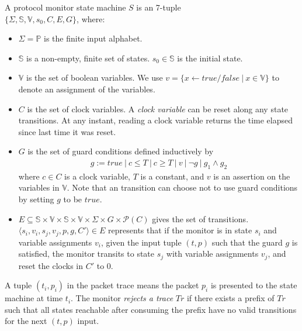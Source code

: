 \begin{definition}
  A protocol monitor state machine $S$ is an 7-tuple\\
  $\{\Sigma, \mathbb{S}, \mathbb{V}, s_0, C, E, G\}$, where:
  \begin{itemize}
    \item $\Sigma = \mathbb{P}$ is the finite input alphabet.

    \item $\mathbb{S}$ is a non-empty, finite set of states. $s_0 \in
      \mathbb{S}$ is the initial state.

    \item $\mathbb{V}$ is the set of boolean variables. We use $v = \{x
      \leftarrow true/false\ |\ x \in \mathbb{V}\}$ to denote an assignment of
      the variables.

    \item $C$ is the set of clock variables. A \textit{clock variable} can be
      reset along any state transitions. At any instant, reading a clock
      variable returns the time elapsed since last time it was reset.

    \item $G$ is the set of guard conditions defined inductively by
      \begin{align*}
        g := true\ |\ c \le T\ |\ c \ge T\ |\ v\ |\ \neg g\ |\ g_1 \land g_2
      \end{align*}%
      where $c \in C$ is a clock variable, $T$ is a constant, and $v$ is an
      assertion on the variables in $\mathbb{V}$. Note that an
      transition can choose not to use guard conditions by setting $g$ to be $true$.

    \item $E \subseteq \mathbb{S} \times \mathbb{V} \times \mathbb{S} \times
      \mathbb{V} \times \Sigma \times  G \times \mathscr{P}(C)$ gives the set of
      transitions.\\ $\langle s_i, v_i, s_j, v_j, p, g, C'\rangle \in E$
      represents that if the monitor is in state $s_i$ and variable assignments
      $v_i$, given the input tuple $(t, p)$ such that the guard $g$ is
      satisfied, the monitor transits to state $s_j$ with variable assignments
      $v_j$, and reset the clocks in $C'$ to 0.
  \end{itemize}
  \label{def:sm}
\end{definition}

A tuple $(t_i, p_i)$ in the packet trace means the packet $p_i$ is presented to
the state machine at time $t_i$. The monitor {\it rejects a trace} $Tr$ if there
exists a prefix of $Tr$ such that all states reachable after consuming the
prefix have no valid transitions for the next $(t, p)$ input.

